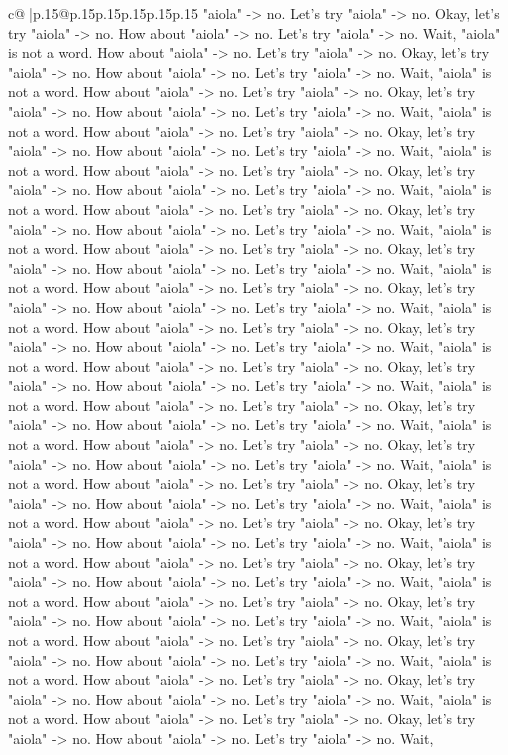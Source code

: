 \documentclass{article}
\begin{document}
{\begin{supertabular}{c@{$\;$}|p{.15\linewidth}@{}p{.15\linewidth}p{.15\linewidth}p{.15\linewidth}p{.15\linewidth}p{.15\linewidth}}
{{{"aiola" {-}> no. Let's try "aiola" {-}> no. Okay, let's try "aiola" {-}> no. How about "aiola" {-}> no. Let's try "aiola" {-}> no. Wait, "aiola" is not a word. How about "aiola" {-}> no. Let's try "aiola" {-}> no. Okay, let's try "aiola" {-}> no. How about "aiola" {-}> no. Let's try "aiola" {-}> no. Wait, "aiola" is not a word. How about "aiola" {-}> no. Let's try "aiola" {-}> no. Okay, let's try "aiola" {-}> no. How about "aiola" {-}> no. Let's try "aiola" {-}> no. Wait, "aiola" is not a word. How about "aiola" {-}> no. Let's try "aiola" {-}> no. Okay, let's try "aiola" {-}> no. How about "aiola" {-}> no. Let's try "aiola" {-}> no. Wait, "aiola" is not a word. How about "aiola" {-}> no. Let's try "aiola" {-}> no. Okay, let's try "aiola" {-}> no. How about "aiola" {-}> no. Let's try "aiola" {-}> no. Wait, "aiola" is not a word. How about "aiola" {-}> no. Let's try "aiola" {-}> no. Okay, let's try "aiola" {-}> no. How about "aiola" {-}> no. Let's try "aiola" {-}> no. Wait, "aiola" is not a word. How about "aiola" {-}> no. Let's try "aiola" {-}> no. Okay, let's try "aiola" {-}> no. How about "aiola" {-}> no. Let's try "aiola" {-}> no. Wait, "aiola" is not a word. How about "aiola" {-}> no. Let's try "aiola" {-}> no. Okay, let's try "aiola" {-}> no. How about "aiola" {-}> no. Let's try "aiola" {-}> no. Wait, "aiola" is not a word. How about "aiola" {-}> no. Let's try "aiola" {-}> no. Okay, let's try "aiola" {-}> no. How about "aiola" {-}> no. Let's try "aiola" {-}> no. Wait, "aiola" is not a word. How about "aiola" {-}> no. Let's try "aiola" {-}> no. Okay, let's try "aiola" {-}> no. How about "aiola" {-}> no. Let's try "aiola" {-}> no. Wait, "aiola" is not a word. How about "aiola" {-}> no. Let's try "aiola" {-}> no. Okay, let's try "aiola" {-}> no. How about "aiola" {-}> no. Let's try "aiola" {-}> no. Wait, "aiola" is not a word. How about "aiola" {-}> no. Let's try "aiola" {-}> no. Okay, let's try "aiola" {-}> no. How about "aiola" {-}> no. Let's try "aiola" {-}> no. Wait, "aiola" is not a word. How about "aiola" {-}> no. Let's try "aiola" {-}> no. Okay, let's try "aiola" {-}> no. How about "aiola" {-}> no. Let's try "aiola" {-}> no. Wait, "aiola" is not a word. How about "aiola" {-}> no. Let's try "aiola" {-}> no. Okay, let's try "aiola" {-}> no. How about "aiola" {-}> no. Let's try "aiola" {-}> no. Wait, "aiola" is not a word. How about "aiola" {-}> no. Let's try "aiola" {-}> no. Okay, let's try "aiola" {-}> no. How about "aiola" {-}> no. Let's try "aiola" {-}> no. Wait, "aiola" is not a word. How about "aiola" {-}> no. Let's try "aiola" {-}> no. Okay, let's try "aiola" {-}> no. How about "aiola" {-}> no. Let's try "aiola" {-}> no. Wait, "aiola" is not a word. How about "aiola" {-}> no. Let's try "aiola" {-}> no. Okay, let's try "aiola" {-}> no. How about "aiola" {-}> no. Let's try "aiola" {-}> no. Wait, "aiola" is not a word. How about "aiola" {-}> no. Let's try "aiola" {-}> no. Okay, let's try "aiola" {-}> no. How about "aiola" {-}> no. Let's try "aiola" {-}> no. Wait, "aiola" is not a word. How about "aiola" {-}> no. Let's try "aiola" {-}> no. Okay, let's try "aiola" {-}> no. How about "aiola" {-}> no. Let's try "aiola" {-}> no. Wait, }}}
\end{supertabular}}
\end{document}

